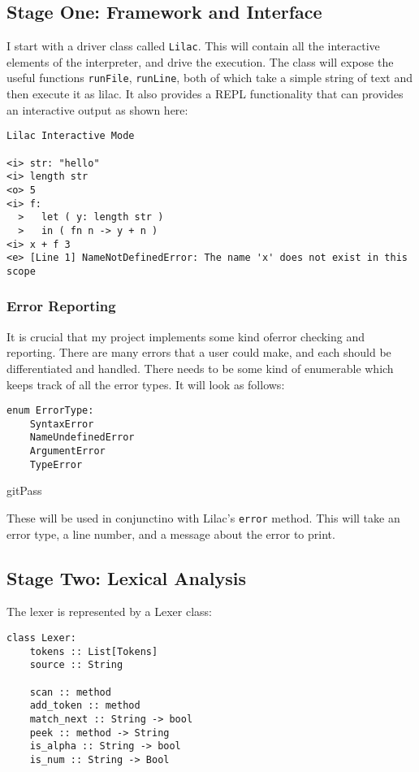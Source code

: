 \documentclass[a4paper, 12pt]{article}
\begin{document}
\subsection{Stage One: Framework and Interface}\label{sec:stage-one-framework-and-interface}
I start with a driver class called \verb|Lilac|. This will contain all the interactive elements of the interpreter, and drive the execution. The class will expose the useful functions \verb|runFile|, \verb|runLine|, both of which take a simple string of text and then execute it as lilac. It also provides a REPL functionality that can provides an interactive output as shown here:\\
\begin{verbatim}
Lilac Interactive Mode

<i> str: "hello"
<i> length str
<o> 5
<i> f:
  >   let ( y: length str )
  >   in ( fn n -> y + n )
<i> x + f 3
<e> [Line 1] NameNotDefinedError: The name 'x' does not exist in this scope
\end{verbatim}
\subsubsection{Error Reporting}\label{sec:error-reporting}
It is crucial that my project implements some kind oferror checking and reporting. There are many errors that a user could make, and each should be differentiated and handled. There needs to be some kind of enumerable which keeps track of all the error types. It will look as follows:\\

\begin{verbatim}
enum ErrorType:
	SyntaxError
	NameUndefinedError
	ArgumentError
	TypeError
\end{verbatim}

gitPass

These will be used in conjunctino with Lilac's \verb|error| method. This will take an error type, a line number, and a message about the error to print.

\subsection{Stage Two: Lexical Analysis}\label{sec:stage-two-lexical-analysis}
The lexer is represented by a Lexer class:

\begin{verbatim}
class Lexer:
    tokens :: List[Tokens]
    source :: String

    scan :: method
    add_token :: method
    match_next :: String -> bool
    peek :: method -> String
    is_alpha :: String -> bool
    is_num :: String -> Bool
\end{verbatim}
\end{document}
